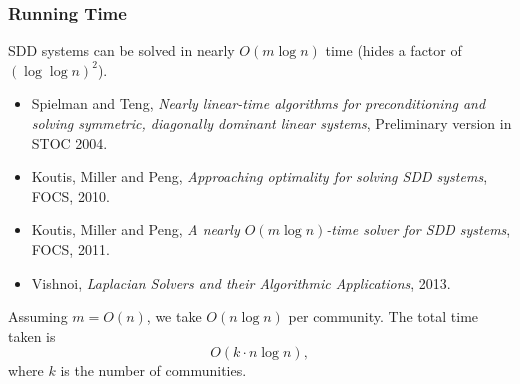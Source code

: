 \documentclass[xcolor=table]{beamer}
\begin{document}
\begin{frame}[t]
\frametitle{Running Time}
SDD systems can be solved in nearly $O(m \log n)$ time (hides a factor of $(\log \log n)^2$). 
\begin{itemize}
	\item Spielman and Teng, \emph{Nearly linear-time algorithms for preconditioning
		and solving symmetric, diagonally dominant linear systems}, Preliminary version 
		in STOC 2004.
	
	\item Koutis, Miller and Peng, \emph{Approaching optimality for solving SDD systems}, 
		FOCS, 2010.

	\item Koutis, Miller and Peng, \emph{A nearly $O(m \log n)$-time solver for SDD systems}, 
		FOCS, 2011.
	
	\item Vishnoi, \emph{Laplacian Solvers and their Algorithmic Applications}, 2013.
\end{itemize}

Assuming $m = O(n)$, we take $O(n \log n)$ per community. The total time taken is
\[
	O(k \cdot n \log n),
\]
where $k$ is the number of communities.
\end{frame}
\end{document}
